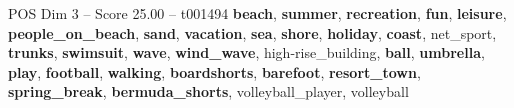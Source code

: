 \begin{textsample}{POS Dim 3 – Score 25.00 – t001494}  \label{ex:f3_pos_012}
\textbf{beach}, \textbf{summer}, \textbf{recreation}, \textbf{fun}, \textbf{leisure}, \textbf{people\_on\_beach}, \textbf{sand}, \textbf{vacation}, \textbf{sea}, \textbf{shore}, \textbf{holiday}, \textbf{coast}, net\_sport, \textbf{trunks}, \textbf{swimsuit}, \textbf{wave}, \textbf{wind\_wave}, high-rise\_building, \textbf{ball}, \textbf{umbrella}, \textbf{play}, \textbf{football}, \textbf{walking}, \textbf{boardshorts}, \textbf{barefoot}, \textbf{resort\_town}, \textbf{spring\_break}, \textbf{bermuda\_shorts}, volleyball\_player, volleyball

\end{textsample}
